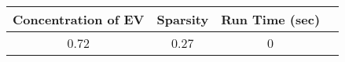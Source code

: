 \begin{tabular}{cccc}
\toprule
 Concentration of EV &  Sparsity & Run Time (sec) \\
\midrule
                0.72 &      0.27 &              0 \\
\bottomrule
\end{tabular}
